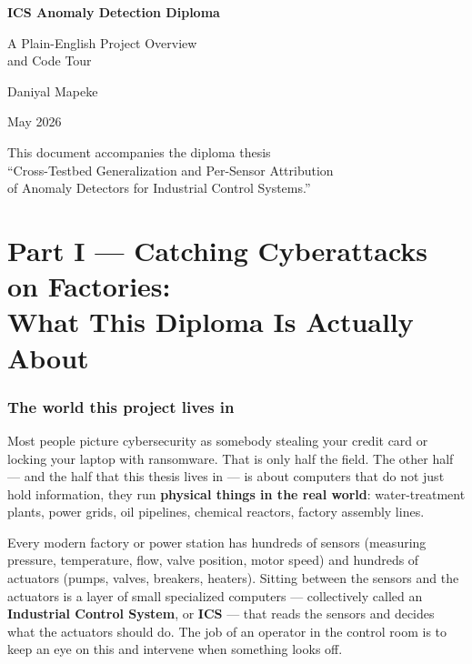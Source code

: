\documentclass[11pt,a4paper]{article}
\begin{document}
\begin{titlepage}
  \centering
  \vspace*{4cm}
  {\Huge\bfseries ICS Anomaly Detection Diploma\par}
  \vspace{1cm}
  {\Large A Plain-English Project Overview\\and Code Tour\par}
  \vspace{3cm}
  {\large Daniyal Mapeke\par}
  \vspace{0.5cm}
  {\large May 2026\par}
  \vfill
  {\small This document accompanies the diploma thesis\\
  ``Cross-Testbed Generalization and Per-Sensor Attribution\\
  of Anomaly Detectors for Industrial Control Systems.''\par}
\end{titlepage}

\tableofcontents
\clearpage

\part*{Part I --- Catching Cyberattacks on Factories:\\What This Diploma Is Actually About}

\section{The world this project lives in}

Most people picture cybersecurity as somebody stealing your credit card or locking your laptop with ransomware. That is only half the field. The other half --- and the half that this thesis lives in --- is about computers that do not just hold information, they run \textbf{physical things in the real world}: water-treatment plants, power grids, oil pipelines, chemical reactors, factory assembly lines.

Every modern factory or power station has hundreds of sensors (measuring pressure, temperature, flow, valve position, motor speed) and hundreds of actuators (pumps, valves, breakers, heaters). Sitting between the sensors and the actuators is a layer of small specialized computers --- collectively called an \textbf{Industrial Control System}, or \textbf{ICS} --- that reads the sensors and decides what the actuators should do. The job of an operator in the control room is to keep an eye on this and intervene when something looks off.
\end{document}
